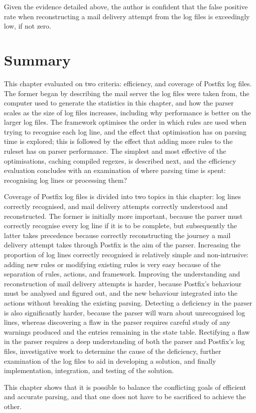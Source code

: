 Given the evidence detailed above, the author is confident that the false
positive rate when reconstructing a mail delivery attempt from the
\numberOFlogFILES{} log files is exceedingly low, if not zero.

\section{Summary}

This chapter evaluated \parsername{} on two criteria: efficiency, and
coverage of Postfix log files.  The former began by describing the mail
server the log files were taken from, the computer used to generate the
statistics in this chapter, and how the parser scales as the size of log
files increases, including why performance is better on the larger log
files.  The framework optimises the order in which rules are used when
trying to recognise each log line, and the effect that optimisation has on
parsing time is explored; this is followed by the effect that adding more
rules to the ruleset has on parser performance.  The simplest and most
effective of the optimisations, caching compiled regexes, is described
next, and the efficiency evaluation concludes with an examination of where
parsing time is spent: recognising log lines or processing them?

Coverage of Postfix log files is divided into two topics in this chapter:
log lines correctly recognised, and mail delivery attempts correctly
understood and reconstructed.  The former is initially more important,
because the parser must correctly recognise every log line if it is to be
complete, but subsequently the latter takes precedence because correctly
reconstructing the journey a mail delivery attempt takes through Postfix is
the aim of the parser.  Increasing the proportion of log lines correctly
recognised is relatively simple and non-intrusive: adding new rules or
modifying existing rules is very easy because of the separation of rules,
actions, and framework.  Improving the understanding and reconstruction of
mail delivery attempts is harder, because Postfix's behaviour must be
analysed and figured out, and the new behaviour integrated into the actions
without breaking the existing parsing.  Detecting a deficiency in the
parser is also significantly harder, because the parser will warn about
unrecognised log lines, whereas discovering a flaw in the parser requires
careful study of any warnings produced and the entries remaining in the
state table.  Rectifying a flaw in the parser requires a deep understanding
of both the parser and Postfix's log files, investigative work to determine
the cause of the deficiency, further examination of the log files to aid in
developing a solution, and finally implementation, integration, and testing
of the solution.

This chapter shows that it is possible to balance the conflicting goals of
efficient and accurate parsing, and that one does not have to be sacrificed
to achieve the other.
